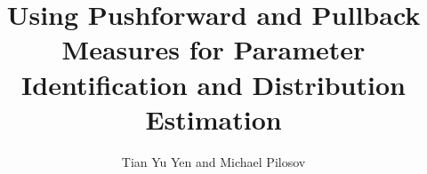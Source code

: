 \documentclass[final]{beamer}
\title{Using Pushforward and Pullback Measures for Parameter Identification and Distribution Estimation}
\author{Tian Yu Yen and Michael Pilosov}
\newlength{\sepwidth}
\newlength{\colwidth}
\newcommand{\separatorcolumn}{\begin{column}{\sepwidth}\end{column}}
\begin{document}
\begin{frame}[t]
\begin{columns}[t]
\separatorcolumn

\begin{column}{\colwidth}

  

\end{column}

\separatorcolumn

\begin{column}{\colwidth}
    
    \vspace{-1.5cm}
    
    \vspace{-1.5cm}
  
  
\end{column}

\separatorcolumn

\begin{column}{\colwidth}

  
  
\end{column}

\separatorcolumn
\end{columns}
\end{frame}
\end{document}
